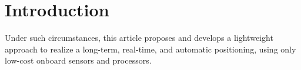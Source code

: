 \documentclass[a4paper]{report}
\begin{document}
\section{Introduction}






Under such circumstances, this article proposes and develops a lightweight approach to realize a long-term, real-time, and automatic positioning, using only low-cost onboard sensors and processors.



 

\end{document}
